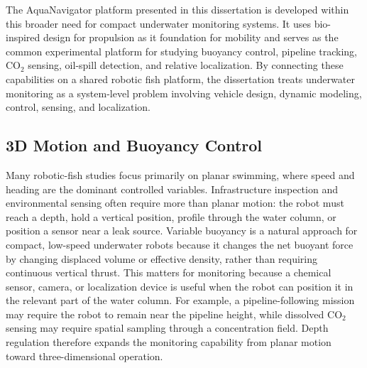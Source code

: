 \documentclass{uhcoethesis}
\begin{document}
The AquaNavigator platform presented in this dissertation is developed within this broader need for compact underwater monitoring systems. It uses bio-inspired design for propulsion as it foundation for mobility and serves as the common experimental platform for studying buoyancy control, pipeline tracking, \mbox{CO$_2$} sensing, oil-spill detection, and relative localization. By connecting these capabilities on a shared robotic fish platform, the dissertation treats underwater monitoring as a system-level problem involving vehicle design, dynamic modeling, control, sensing, and localization.

\subsection{3D Motion and Buoyancy Control}

Many robotic-fish studies focus primarily on planar swimming, where speed and heading are the dominant controlled variables. Infrastructure inspection and environmental sensing often require more than planar motion: the robot must reach a depth, hold a vertical position, profile through the water column, or position a sensor near a leak source. Variable buoyancy is a natural approach for compact, low-speed underwater robots because it changes the net buoyant force by changing displaced volume or effective density, rather than requiring continuous vertical thrust. This matters for monitoring because a chemical sensor, camera, or localization device is useful when the robot can position it in the relevant part of the water column. For example, a pipeline-following mission may require the robot to remain near the pipeline height, while dissolved \mbox{CO$_2$} sensing may require spatial sampling through a concentration field. Depth regulation therefore expands the monitoring capability from planar motion toward three-dimensional operation.
\end{document}
